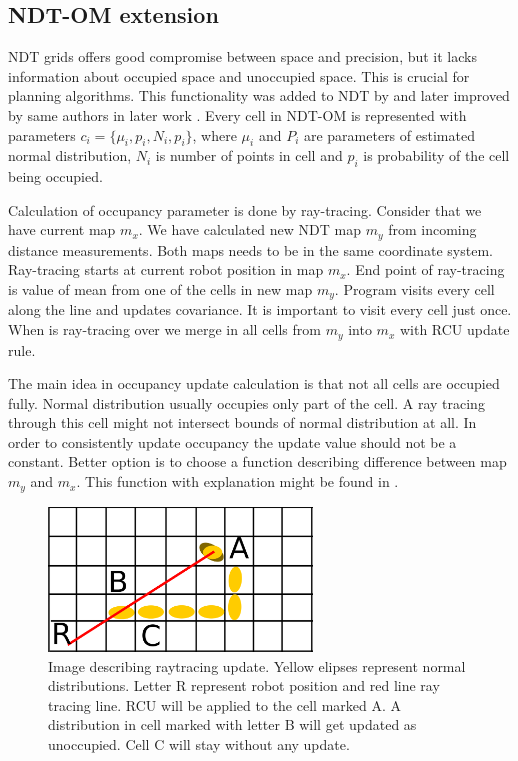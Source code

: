 \subsection{NDT-OM extension}
\label{subsec:NDT_OM}
\gls{NDT} grids offers good compromise between space and precision, but it lacks information about occupied space and unoccupied space. This is crucial for planning algorithms. This functionality was added to NDT by \cite{Saarinen13} and later improved by same authors in later work \cite{Saarinen213}. Every cell in \gls{NDT-OM} is represented with parameters $c_{i}=\{\mu_{i}, p_{i}, N_{i},p_{i}\}$, where $\mu_{i}$ and $P_{i}$ are parameters of estimated normal distribution, $N_{i}$ is number of points in cell and $p_{i}$ is probability of the cell being occupied. 

Calculation of occupancy parameter is done by ray-tracing. Consider that we have current map $m_{x}$. We have calculated new NDT map $m_{y}$ from incoming distance measurements. Both maps needs to be in the same coordinate system. Ray-tracing starts at current robot position in map $m_{x}$. End point of ray-tracing is value of mean from one of the cells in new map $m_{y}$. Program visits every cell along the line and updates covariance. It is important to visit every cell just once. When is ray-tracing over we merge in all cells from $m_{y}$ into $m_{x}$ with RCU update rule.

The main idea in occupancy update calculation is that not all cells are occupied fully. Normal distribution usually occupies only part of the cell. A ray tracing through this cell might not intersect bounds of normal distribution at all. In order to consistently update occupancy the update value should not be a constant. Better option is to choose a function describing difference between map $m_{y}$ and $m_{x}$. This function with explanation might be found in \cite{Saarinen213}.
\begin{figure}
	\centering
	\includegraphics[width=70mm]{../img/ray_trace2.png}
	\caption{Image describing raytracing update. Yellow elipses represent normal distributions. Letter R represent robot position and red line ray tracing line. \gls{RCU} will be applied to the cell marked A. A distribution in cell marked with letter B will get updated as unoccupied. Cell C will stay without any update.}
	\label{fig:raytrace}
\end{figure}

